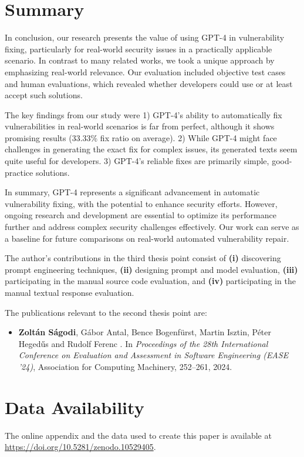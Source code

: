 \section{Summary}
\label{sec:summary}

In conclusion, our research presents the value of using GPT-4 in vulnerability fixing, particularly for real-world security issues in a practically applicable scenario.
In contrast to many related works, we took a unique approach by emphasizing real-world relevance.
Our evaluation included objective test cases and human evaluations, which revealed whether developers could use or at least accept such solutions.

The key findings from our study were
1) GPT-4's ability to automatically fix vulnerabilities in real-world scenarios is far from perfect, although it shows promising results (33.33\%\xspace fix ratio on average).
2) While GPT-4 might face challenges in generating the exact fix for complex issues, its generated texts seem quite useful for developers.
3) GPT-4's reliable fixes are primarily simple, good-practice solutions.

In summary, GPT-4 represents a significant advancement in automatic vulnerability fixing, with the potential to enhance security efforts.
However, ongoing research and development are essential to optimize its performance further and address complex security challenges effectively.
Our work can serve as a baseline for future comparisons on real-world automated vulnerability repair.


\vspace*{1cm}
The author’s contributions in the third thesis point consist of \textbf{(i)} discovering prompt engineering techniques, \textbf{(ii)} designing prompt and model evaluation, \textbf{(iii)} participating in the manual source code evaluation, and \textbf{(iv)} participating in the manual textual response evaluation.

The publications relevant to the second thesis point are:
\begin{itemize}
	\item \textbf{Zoltán Ságodi}, Gábor Antal, Bence Bogenfürst, Martin Isztin, Péter Heged\H{u}s and Rudolf Ferenc
	.
	\newblock In \emph{Proceedings of the 28th International Conference on Evaluation and Assessment in Software Engineering (EASE '24)}, Association for Computing Machinery, 252–261, 2024.
\end{itemize}

\section*{Data Availability}
The online appendix and the data used to create this paper is available at \url{https://doi.org/10.5281/zenodo.10529405}.

